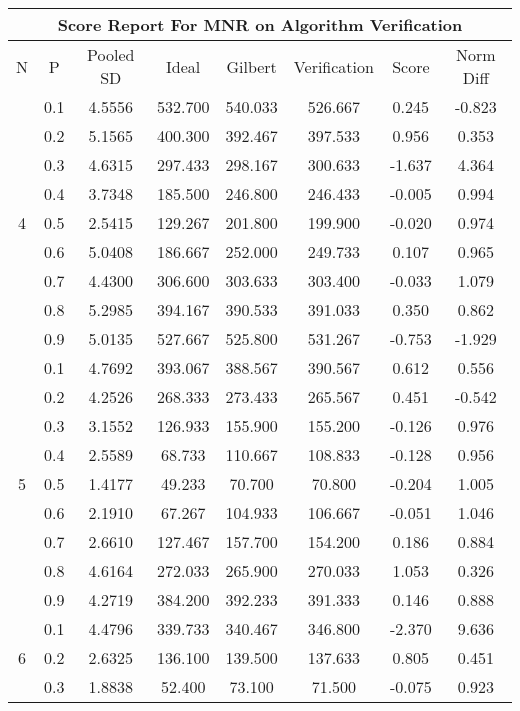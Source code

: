 \documentclass[11pt,a4paper]{report}
\begin{document}
\begin{longtable}{ | c | c || c | c | c | c | c | c | }
\hline
\multicolumn{8}{|c|}{ Score Report For MNR on Algorithm Verification} \\
\hline
N & P & Pooled SD &  Ideal &  Gilbert & Verification  & Score & Norm Diff \\
 \hline
 \hline
 \endhead
\multirow{9}{*}{4} & 0.1 & 4.5556 & 532.700 & 540.033 & 526.667 & 0.245 & -0.823 \\
 & 0.2 & 5.1565 & 400.300 & 392.467 & 397.533 & 0.956 & 0.353 \\
 & 0.3 & 4.6315 & 297.433 & 298.167 & 300.633 & -1.637 & 4.364 \\
 & 0.4 & 3.7348 & 185.500 & 246.800 & 246.433 & -0.005 & 0.994 \\
 & 0.5 & 2.5415 & 129.267 & 201.800 & 199.900 & -0.020 & 0.974 \\
 & 0.6 & 5.0408 & 186.667 & 252.000 & 249.733 & 0.107 & 0.965 \\
 & 0.7 & 4.4300 & 306.600 & 303.633 & 303.400 & -0.033 & 1.079 \\
 & 0.8 & 5.2985 & 394.167 & 390.533 & 391.033 & 0.350 & 0.862 \\
 & 0.9 & 5.0135 & 527.667 & 525.800 & 531.267 & -0.753 & -1.929 \\
 \hline
\multirow{9}{*}{5} & 0.1 & 4.7692 & 393.067 & 388.567 & 390.567 & 0.612 & 0.556 \\
 & 0.2 & 4.2526 & 268.333 & 273.433 & 265.567 & 0.451 & -0.542 \\
 & 0.3 & 3.1552 & 126.933 & 155.900 & 155.200 & -0.126 & 0.976 \\
 & 0.4 & 2.5589 & 68.733 & 110.667 & 108.833 & -0.128 & 0.956 \\
 & 0.5 & 1.4177 & 49.233 & 70.700 & 70.800 & -0.204 & 1.005 \\
 & 0.6 & 2.1910 & 67.267 & 104.933 & 106.667 & -0.051 & 1.046 \\
 & 0.7 & 2.6610 & 127.467 & 157.700 & 154.200 & 0.186 & 0.884 \\
 & 0.8 & 4.6164 & 272.033 & 265.900 & 270.033 & 1.053 & 0.326 \\
 & 0.9 & 4.2719 & 384.200 & 392.233 & 391.333 & 0.146 & 0.888 \\
 \hline
\multirow{9}{*}{6} & 0.1 & 4.4796 & 339.733 & 340.467 & 346.800 & -2.370 & 9.636 \\
 & 0.2 & 2.6325 & 136.100 & 139.500 & 137.633 & 0.805 & 0.451 \\
 & 0.3 & 1.8838 & 52.400 & 73.100 & 71.500 & -0.075 & 0.923 \\

\end{longtable}
\end{document}
